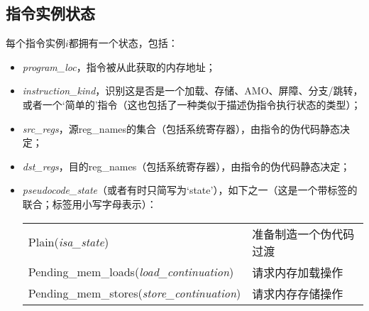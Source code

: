 \subsection{指令实例状态}\label{sec:omm:inst_state}
每个指令实例$i$都拥有一个状态，包括：
\begin{itemize}
\item {\it program\_loc}，指令被从此获取的内存地址； %
\item {\it instruction\_kind}，识别这是否是一个加载、存储、AMO、屏障、分支/跳转，或者一个‘简单的’指令（这也包括了一种类似于描述伪指令执行状态的类型）； %
\item {\it src\_regs}，源reg_names的集合（包括系统寄存器），由指令的伪代码静态决定； %
\item {\it dst\_regs}，目的reg_names（包括系统寄存器），由指令的伪代码静态决定； %
\item {\it pseudocode\_state}（或者有时只简写为‘state’），如下之一（这是一个带标签的联合；标签用小写字母表示）：  %
  \begin{center}
  \begin{tabular}{l@{ \quad-\quad }l}
  {\sc Plain}({\it isa\_state})
    & 准备制造一个伪代码过渡 \\
  {\sc Pending\_mem\_loads}({\it load\_continuation})
    & 请求内存加载操作 \\
  {\sc Pending\_mem\_stores}({\it store\_continuation})
    & 请求内存存储操作 \\
  \end{tabular}
  \end{center}


\end{itemize}
